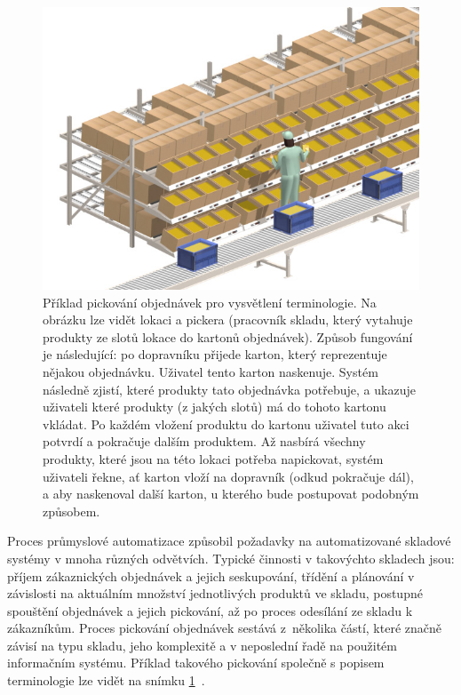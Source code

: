 \begin{figure}[t]
    \centering
    \includegraphics[width=0.8\linewidth]{figures/slap_ea/location_rack.jpg}
    \caption{Příklad pickování objednávek pro vysvětlení terminologie\protect\footnotemark{}. Na obrázku lze vidět lokaci a pickera (pracovník skladu, který vytahuje produkty ze slotů lokace do kartonů objednávek). Způsob fungování je následující: po dopravníku přijede karton, který reprezentuje nějakou objednávku. Uživatel tento karton naskenuje. Systém následně zjistí, které produkty tato objednávka potřebuje, a ukazuje uživateli které produkty (z jakých slotů) má do tohoto kartonu vkládat. Po každém vložení produktu do kartonu uživatel tuto akci potvrdí a pokračuje dalším produktem. Až nasbírá všechny produkty, které jsou na této lokaci potřeba napickovat, systém uživateli řekne, ať karton vloží na dopravník (odkud pokračuje dál), a aby naskenoval další karton, u kterého bude postupovat podobným způsobem.}
    \label{fig:locationRackExplained}
\end{figure}

Proces průmyslové automatizace způsobil požadavky na automatizované skladové systémy v mnoha různých odvětvích. Typické činnosti v takovýchto skladech jsou: příjem zákaznických objednávek a jejich seskupování, třídění a plánování v závislosti na aktuálním množství jednotlivých produktů ve skladu, postupné spouštění objednávek a jejich pickování, až po proces odesílání ze skladu k zákazníkům. Proces pickování objednávek sestává z~několika částí, které značně závisí na typu skladu, jeho komplexitě a v neposlední řadě na použitém informačním systému. Příklad takového pickování společně s popisem terminologie lze vidět na snímku \ref{fig:locationRackExplained}~\cite{whModelSim, optimisationOrderPickingGA}. 


